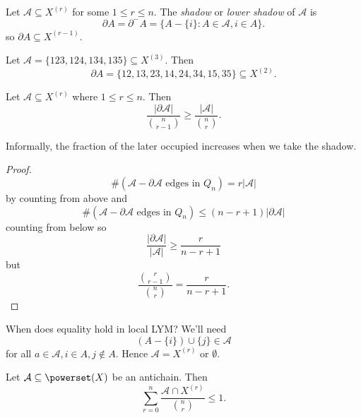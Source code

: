 \documentclass[a4paper]{article}
\newcommand{\shadow}{\partial}
\begin{document}
\begin{definition}
  Let \(\mathcal A \subseteq X^{(r)}\) for some \(1 \leq r \leq n\). The \emph{shadow} or \emph{lower shadow} of \(\mathcal A\) is
  \[
    \shadow A = \shadow^- A = \{A - \{i\}: A \in \mathcal A, i \in A\}.
  \]
  so \(\shadow A \subseteq X^{(r - 1)}\).
\end{definition}

\begin{eg}
  Let \(\mathcal A = \{123, 124, 134, 135\} \subseteq X^{(3)}\). Then
  \[
    \shadow A = \{12, 13, 23, 14, 24, 34, 15, 35\} \subseteq X^{(2)}.
  \]
\end{eg}

\begin{lemma}
  Let \(\mathcal A \subseteq X^{(r)}\) where \(1 \leq r \leq n\). Then
  \[
    \frac{|\shadow \mathcal A|}{\binom{n}{r - 1}} \geq \frac{|\mathcal A|}{\binom{n}{r}}.
  \]
\end{lemma}

Informally, the fraction of the later occupied increases when we take the shadow.

\begin{proof}
  \[
    \#(\mathcal A - \shadow \mathcal A \text{ edges in } Q_n) = r|\mathcal A|
  \]
  by counting from above and
  \[
    \#(\mathcal A - \shadow \mathcal A \text{ edges in } Q_n) \leq (n - r + 1) |\shadow \mathcal A|
  \]
  counting from below so
  \[
    \frac{|\shadow \mathcal A|}{|\mathcal A|} \geq \frac{r}{n - r + 1}
  \]
  but
  \[
    \frac{\binom{r}{r - 1}}{\binom{n}{r}} = \frac{r}{n - r + 1}.
  \]
\end{proof}

When does equality hold in local LYM? We'll need
\[
  (A - \{i\}) \cup \{j\} \in \mathcal A
\]
for all \(a \in \mathcal A, i \in A, j \notin A\). Hence \(\mathcal A = X^{(r)}\) or \(\emptyset\).

\begin{theorem}
  Let \(\mathcal A \subseteq \powerset(X)\) be an antichain. Then
  \[
    \sum_{r = 0}^n \frac{\mathcal A \cap X^{(r)}}{\binom{n}{r}} \leq 1.
  \]
\end{theorem}
\end{document}
